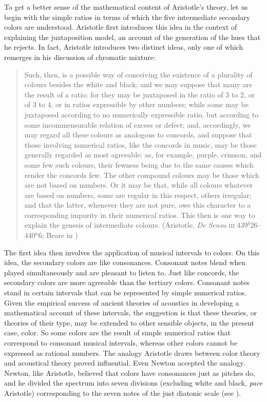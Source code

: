 To get a better sense of the mathematical content of Aristotle's theory, let us begin with the simple ratios in terms of which the five intermediate secondary colors are understood. Aristotle first introduces this idea in the context of explaining the juxtaposition model, an account of the generation of the hues that he rejects. In fact, Aristotle introduces two distinct ideas, only one of which remerges in his discussion of chromatic mixture:
\begin{quote}
	Such, then, is a possible way of conceiving the existence of a plurality of colours besides the white and black; and we may suppose that many are the result of a ratio; for they may be juxtaposed in the ratio of 3 to 2, or of 3 to 4, or in ratios expressible by other numbers; while some may be juxtaposed according to no numerically expressible ratio, but according to some incommensurable relation of excess or defect; and, accordingly, we may regard all these colours as analogous to concords, and suppose that those involving numerical ratios, like the concords in music, may be those generally regarded as most agreeable; as, for example, purple, crimson, and some few such colours, their fewness being due to the same causes which render the concords few. The other compound colours may be those which are not based on numbers. Or it may be that, while all colours whatever are based on numbers, some are regular in this respect, others irregular; and that the latter, whenever they are not pure, owe this character to a corresponding impurity in their numerical ratios. This then is one way to explain the genesis of intermediate colours. (Aristotle, \emph{De Sensu} \textsc{iii} 439\( ^{b} \)26--440\( ^{a} \)6; Beare in \citealt[8]{Barnes:1984uq})
\end{quote}

The first idea then involves the application of musical intervals to colors. On this idea, the secondary colors are like consonances. Consonant notes blend when played simultaneously and are pleasant to listen to. Just like concords, the secondary colors are more agreeable than the tertiary colors. Consonant notes stand in certain intervals that can be represented by simple numerical ratios. Given the empirical success of ancient theories of acoustics in developing a mathematical account of these intervals, the suggestion is that these theories, or theories of their type, may be extended to other sensible objects, in the present case, color. So some colors are the result of simple numerical ratios that correspond to consonant musical intervals, whereas other colors cannot be expressed as rational numbers. The analogy Aristotle draws between color theory and acoustical theory proved influential. Even Newton accepted the analogy. Newton, like Aristotle, believed that colors have consonances just as pitches do, and he divided the spectrum into seven divisions (excluding white and black, \emph{pace} Aristotle) corresponding to the seven notes of the just diatonic scale (see \citealt[619]{Shapiro:1994uq}).

